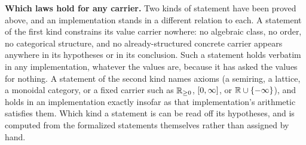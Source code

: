 %
\textbf{Which laws hold for any carrier.} Two kinds of statement have
been proved above, and an implementation stands in a different relation
to each. A statement of the first kind constrains its value carrier
nowhere: no algebraic class, no order, no categorical structure, and no
already-structured concrete carrier appears anywhere in its hypotheses
or in its conclusion. Such a statement holds verbatim in any
implementation, whatever the values are, because it has asked the
values for nothing. A statement of the second kind names axioms (a
semiring, a lattice, a monoidal category, or a fixed carrier such as
$\mathbb R_{\ge 0}$, $[0,\infty]$, or $\mathbb R \cup \{-\infty\}$), and holds in an implementation exactly
insofar as that implementation's arithmetic satisfies them. Which kind
a statement is can be read off its hypotheses, and is computed from the
formalized statements themselves rather than assigned by hand.
